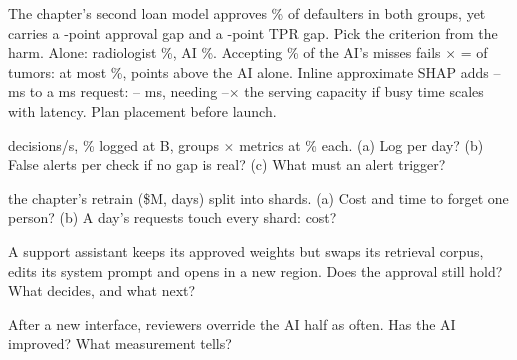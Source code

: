 \documentclass{studysheet}
\begin{document}
\begin{rightcol}
%
  {The chapter's second loan model approves \% of defaulters in both groups, yet carries a
   -point approval gap and a -point TPR gap. Pick the criterion from the harm.}{}
%
  {Alone: radiologist \%, AI \%. Accepting \% of the AI's misses fails
    $\times$  =  of tumors: at most \%,  points above the AI alone.}{}
%
  {Inline approximate SHAP adds -- ms to a  ms request:
   -- ms, needing --$\times$ the serving capacity if busy time scales with latency. Plan placement before launch.}{}

\vspace{4pt}
\begin{qs}
\item \assumed{}  decisions/s, \% logged at  B,  groups
  $\times$  metrics at \% each. (a) Log per day? (b) False alerts per check if no
  gap is real? (c) What must an alert trigger?
\item \assumed{} the chapter's retrain (\$M,  days) split into  shards.
  (a) Cost and time to forget one person? (b) A day's  requests touch every shard: cost?
\item A support assistant keeps its approved weights but swaps its retrieval corpus, edits its system prompt and opens in a new region.
  Does the approval still hold? What decides, and what next?
\item After a new interface, reviewers override the AI half as often. Has the AI improved? What
  measurement tells?
\end{qs}
\end{rightcol}
\end{document}
